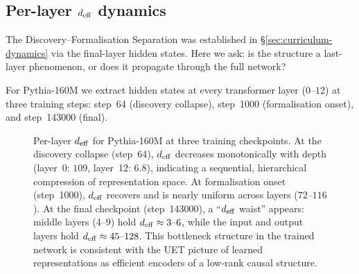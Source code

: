 \subsection{Per-layer $d_{\mathrm{eff}}$ dynamics}
\label{sec:layer-deff}

The Discovery--Formalisation Separation was established in \S\ref{sec:curriculum-dynamics}
via the final-layer hidden states.  Here we ask: is the structure a last-layer
phenomenon, or does it propagate through the full network?

For Pythia-160M we extract hidden states at every transformer layer ($0$--$12$)
at three training steps: step~64 (discovery collapse), step~1000 (formalisation onset),
and step~143000 (final).

\begin{figure}[H]
\centering
{}
\caption{Per-layer $d_{\mathrm{eff}}$ for Pythia-160M at three training checkpoints.
At the discovery collapse (step~64), $d_{\mathrm{eff}}$ decreases monotonically with
depth (layer~0: $109$, layer~12: $6.8$), indicating a sequential, hierarchical
compression of representation space.
At formalisation onset (step~1000), $d_{\mathrm{eff}}$ recovers and is nearly uniform
across layers ($72$--$116$).
At the final checkpoint (step~143000), a ``$d_{\mathrm{eff}}$ waist'' appears: middle
layers (4--9) hold $d_{\mathrm{eff}} \approx 3\text{--}6$, while the input and output
layers hold $d_{\mathrm{eff}} \approx 45\text{--}128$.  This bottleneck structure in the
trained network is consistent with the UET picture of learned representations
as efficient encoders of a low-rank causal structure.}
\label{fig:layer-deff}
\end{figure}

